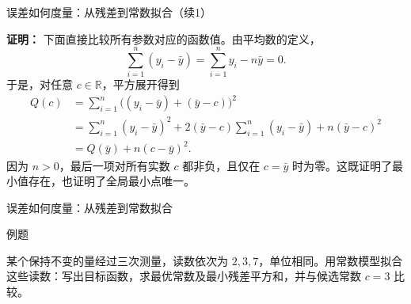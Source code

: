 \documentclass[aspectratio=169,10pt,fontset=fandol]{ctexbeamer}
\begin{document}
\begin{frame}[t,fragile]{误差如何度量：从残差到常数拟合（续1）}
\footnotesize
{\footnotesize
\textbf{证明：}
下面直接比较所有参数对应的函数值。由平均数的定义，
\[
\sum_{i=1}^{n}(y_i-\bar{y})=\sum_{i=1}^{n}y_i-n\bar{y}=0.
\]
于是，对任意 $c\in\mathbb{R}$，平方展开得到
\[
\begin{aligned}
Q(c)&=\sum_{i=1}^{n}\bigl((y_i-\bar{y})+(\bar{y}-c)\bigr)^2\\
&=\sum_{i=1}^{n}(y_i-\bar{y})^2
 +2(\bar{y}-c)\sum_{i=1}^{n}(y_i-\bar{y})
 +n(\bar{y}-c)^2\\
&=Q(\bar{y})+n(c-\bar{y})^2.
\end{aligned}
\]
因为 $n>0$，最后一项对所有实数 $c$ 都非负，且仅在 $c=\bar{y}$ 时为零。这既证明了最小值存在，也证明了全局最小点唯一。

}
\end{frame}
\begin{frame}[t,fragile]{误差如何度量：从残差到常数拟合}
\normalsize
\begin{block}{例题}
{\normalsize
某个保持不变的量经过三次测量，读数依次为 $2,3,7$，单位相同。用常数模型拟合这些读数：写出目标函数，求最优常数及最小残差平方和，并与候选常数 $c=3$ 比较。

}
\end{block}
\end{frame}
\end{document}
